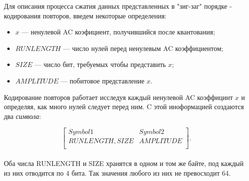 \documentclass{matmex-diploma-custom}
\begin{document}

Для описания процесса сжатия  данных представленных в "зиг-заг" порядке - кодирования повторов, введем некоторые определения:


\begin{itemize}
    \item{
        $x$ --- ненулевой AC коэфициент, получившийся после квантования;
    }
    \item{
        $RUNLENGTH$ --- число нулей перед ненулевым AC коэффициентом;
    }
     \item{
        $SIZE$ --- число бит, требуемых чтобы представить $x$;
     }
    \item{
        $AMPLITUDE$ --- побитовое представление $x$.
    }
\end{itemize}

Кодирование повторов работает исследуя каждый  ненулевой AC коэффицинт $x$ и определяя, как много нулей следует перед ним. C этой иноформацией создаются два \emph{символа}:


  $$ \begin{bmatrix}
        Symbol 1 & Symbol 2 \\
        RUNLENGTH, SIZE& AMPLITUDE\\

       \end{bmatrix}. $$\\

  Оба числа RUNLENGTH и SIZE  хранятся в одном и том же байте, под каждый из них отводится по 4 бита. Так значения любого из них не превосходит 64.

\end{document}
